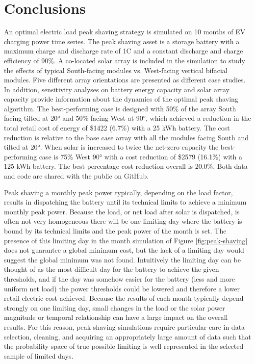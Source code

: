 \documentclass[journal,article,submit,pdftex,moreauthors]{Definitions/mdpi}
\begin{document}
\section{Conclusions}\label{conclusions}

An optimal electric load peak shaving strategy is simulated on 10 months of EV charging power time series. The peak shaving asset is a storage battery with a maximum charge and discharge rate of 1C and a constant discharge and charge efficiency of 90\%. A co-located solar array is included in the simulation to study the effects of typical South-facing modules vs. West-facing vertical bifacial modules. Five different array orientations are presented as different case studies. In addition, sensitivity analyses on battery energy capacity and solar array capacity provide information about the dynamics of the optimal peak shaving algorithm. The best-performing case is designed with 50\% of the array South facing tilted at 20° and 50\% facing West at 90°, which achieved a reduction in the total retail cost of energy of \$1422 (6.7\%) with a 25 kWh battery. The cost reduction is relative to the base case array with all the modules facing South and tilted at 20°. When solar is increased to twice the net-zero capacity the best-performing case is 75\% West 90° with a cost reduction of \$2579 (16.1\%) with a 125 kWh battery. The best percentage cost reduction overall is 20.0\%. Both data and code are shared with the public on GitHub.

Peak shaving a monthly peak power typically, depending on the load factor, results in dispatching the battery until its technical limits to achieve a minimum monthly peak power. Because the load, or net load after solar is dispatched, is often not very homogeneous there will be one limiting day where the battery is bound by its technical limits and the peak power of the month is set. The presence of this limiting day in the month simulation of Figure \ref{fig:peak-shaving} does not guarantee a global minimum cost, but the lack of a limiting day would suggest the global minimum was not found. Intuitively the limiting day can be thought of as the most difficult day for the battery to achieve the given thresholds, and if the day was somehow easier for the battery (less and more uniform net load) the power thresholds could be lowered and therefore a lower retail electric cost achieved. Because the results of each month typically depend strongly on one limiting day, small changes in the load or the solar power magnitude or temporal relationship can have a large impact on the overall results. For this reason, peak shaving simulations require particular care in data selection, cleaning, and acquiring an appropriately large amount of data such that the probability space of true possible limiting is well represented in the selected sample of limited days.
\end{document}
